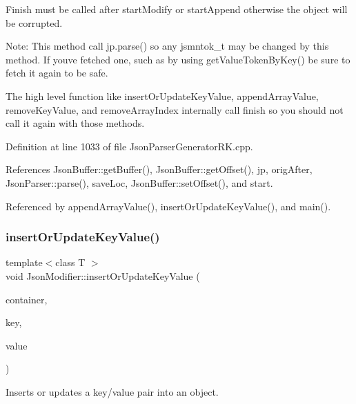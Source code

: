 Finish must be called after start\+Modify or start\+Append otherwise the object will be corrupted.

Note\+: This method call jp.\+parse() so any jsmntok\+\_\+t may be changed by this method. If you\textquotesingle{}ve fetched one, such as by using get\+Value\+Token\+By\+Key() be sure to fetch it again to be safe.

The high level function like insert\+Or\+Update\+Key\+Value, append\+Array\+Value, remove\+Key\+Value, and remove\+Array\+Index internally call finish so you should not call it again with those methods. 

Definition at line 1033 of file Json\+Parser\+Generator\+R\+K.\+cpp.



References Json\+Buffer\+::get\+Buffer(), Json\+Buffer\+::get\+Offset(), jp, orig\+After, Json\+Parser\+::parse(), save\+Loc, Json\+Buffer\+::set\+Offset(), and start.



Referenced by append\+Array\+Value(), insert\+Or\+Update\+Key\+Value(), and main().

\mbox{\label{class_json_modifier_acca6028c0ec31489950f43e86c574229}} 
\subsubsection{\texorpdfstring{insert\+Or\+Update\+Key\+Value()}{insertOrUpdateKeyValue()}}
{\footnotesize\ttfamily template$<$class T $>$ \\
void Json\+Modifier\+::insert\+Or\+Update\+Key\+Value (\begin{DoxyParamCaption}\item[{const \hyperlink{struct_json_parser_generator_r_k_1_1jsmntok__t}{Json\+Parser\+Generator\+R\+K\+::jsmntok\+\_\+t} $\ast$}]{container,  }\item[{const char $\ast$}]{key,  }\item[{T}]{value }\end{DoxyParamCaption})\hspace{0.3cm}{\ttfamily [inline]}}



Inserts or updates a key/value pair into an object. 


